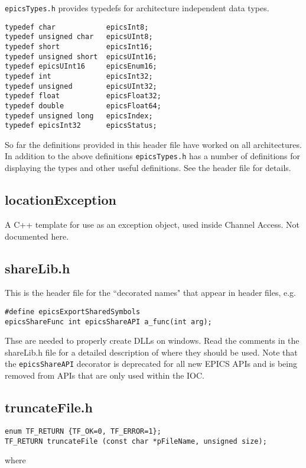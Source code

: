 \verb|epicsTypes.h| provides typedefs for architecture independent data types.

\begin{verbatim}typedef char            epicsInt8;
typedef unsigned char   epicsUInt8;
typedef short           epicsInt16;
typedef unsigned short  epicsUInt16;
typedef epicsUInt16     epicsEnum16;
typedef int             epicsInt32;
typedef unsigned        epicsUInt32;
typedef float           epicsFloat32;
typedef double          epicsFloat64;
typedef unsigned long   epicsIndex;
typedef epicsInt32      epicsStatus;
\end{verbatim}So far the definitions provided in this header file have worked on all architectures. In addition to the above definitions 
\verb|epicsTypes.h| has a number of definitions for displaying the types and other useful definitions. See the header file for 
details.

\subsection{locationException}

A C++ template for use as an exception object, used inside Channel Access. Not documented here.

\subsection{shareLib.h}

This is the header file for the ``decorated names" that appear in header files, e.g.

\begin{verbatim}#define epicsExportSharedSymbols
epicsShareFunc int epicsShareAPI a_func(int arg);
\end{verbatim}
Thse are needed to properly create DLLs on windows. Read the comments in the shareLib.h file for a detailed description 
of where they should be used. Note that the \verb|epicsShareAPI| decorator is deprecated for all new EPICS APIs and is 
being removed from APIs that are only used within the IOC.

\subsection{truncateFile.h}

\begin{verbatim}enum TF_RETURN {TF_OK=0, TF_ERROR=1};
TF_RETURN truncateFile (const char *pFileName, unsigned size);
\end{verbatim}where

